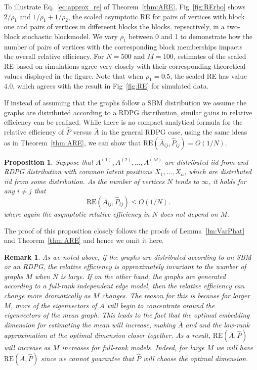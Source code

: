 \documentclass[10pt,letterpaper]{article}
\newtheorem{proposition}[fact]{Proposition}
\newtheorem{remark}[fact]{Remark}
\begin{document}
To illustrate Eq.~\ref{eq:approx_re} of Theorem~\ref{thm:ARE}, Fig~\ref{fig:RErho} shows $2/\rho_1$ and $1/\rho_1+1/\rho_2$, the scaled asymptotic RE for pairs of vertices with block one and pairs of vertices in differeent blocks the blocks, repsectively, in a  two-block stochastic blockmodel.
We vary $\rho_1$ between 0 and 1 to demonstrate how the number of pairs of vertices with the corresponding block memberships impacts the overall relative efficiency.
For $N=500$ and $M=100$, estimates of the scaled RE based on simulations agree very closely with their corresponding theoretical values displayed in the figure. Note that when $\rho_1 = 0.5$, the scaled RE has value $4.0$, which agrees with the result in Fig~\ref{fig:RE} for simulated data.



If instead of assuming that the graphs follow a SBM distribution we assume the graphs are distributed according to a RDPG distribution, similar gains in relative efficiency can be realized.
While there is no compact analytical formula for the relative efficiency of $\hat{P}$ versus $\bar{A}$ in the general RDPG case, using the same ideas as in Theorem~\ref{thm:ARE}, we can show that $\mathrm{RE}(\bar{A}_{ij},\hat{P}_{ij}) = O(1/N)$.

\begin{proposition}
Suppose that $A^{(1)},A^{(2)},\dotsc,A^{(M)}$ are distributed iid from and RDPG distribution with common latent positions $X_1,\dotsc,X_n$, which are distributed iid from some distribution.
As the number of vertices $N$ tends to $\infty$, it holds for any $i\neq j$ that 
\[
    \mathrm{RE}(\bar{A}_{ij},\hat{P}_{ij}) \leq O(1/N).
\]
where again the asymptotic relative efficiency in $N$ does not depend on $M$.
\end{proposition}
The proof of this proposition closely follows the proofs of Lemma~\ref{lm:VarPhat} and Theorem~\ref{thm:ARE} and hence we omit it here.

\begin{remark}
As we noted above, if the graphs are distributed according to an SBM or an RDPG, the relative efficiency is approximately invariant to the number of graphs $M$ when $N$ is large.
If on the other hand, the graphs are generated according to a full-rank independent edge model, then the relative efficiency can change more dramatically as $M$ changes. 
The reason for this is because for larger $M$, more of the eigenvectors of $\bar{A}$ will begin to concentrate around the eigenvectors of the mean graph.
This leads to the fact that the optimal embedding dimension for estimating the mean will increase, making $\bar{A}$ and and the low-rank approximation at the optimal dimension closer together. 
As a result, $\mathrm{RE}(\bar{A},\hat{P})$ will increase as $M$ increases for full-rank models.
Indeed, for large $M$ we will have $\mathrm{RE}(\bar{A},\hat{P})$ since we cannot guarantee that $\hat{P}$ will choose the optimal dimension.
\end{remark}
\end{document}
